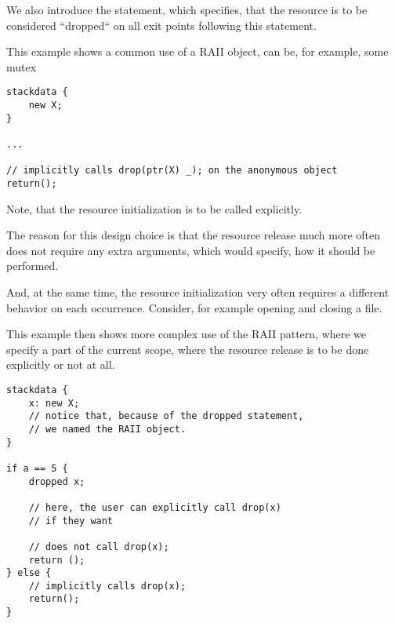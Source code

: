 We also introduce the  statement, which specifies, that the resource is to be considered ``dropped`` on all exit points following this statement.

\begin{ex}
    This example shows a common use of a RAII object,  can be, for example, some mutex
    \begin{lstlisting}
stackdata {
    new X;
}

...

// implicitly calls drop(ptr(X) _); on the anonymous object
return();
    \end{lstlisting}
\end{ex}

\begin{remark}
    Note, that the resource initialization is to be called explicitly.

    The reason for this design choice is that the resource release much more often does not require any extra arguments, which would specify, how it should be performed.

    And, at the same time, the resource initialization very often requires a different behavior on each occurrence. Consider, for example opening and closing a file.
\end{remark}

\begin{ex}
    This example then shows more complex use of the RAII pattern, where we specify a part of the current scope, where the resource release is to be done explicitly or not at all.

    \begin{lstlisting}
stackdata {
    x: new X;
    // notice that, because of the dropped statement,
    // we named the RAII object.
}

if a == 5 {
    dropped x;

    // here, the user can explicitly call drop(x)
    // if they want

    // does not call drop(x);
    return ();
} else {
    // implicitly calls drop(x);
    return();
}
    \end{lstlisting}
\end{ex}
